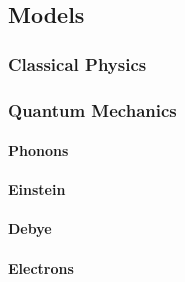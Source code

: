 \subsection{Models}

\subsubsection{Classical Physics}

\subsubsection{Quantum Mechanics}

\paragraph{Phonons}

\paragraph{Einstein}

\paragraph{Debye}

\paragraph{Electrons}
